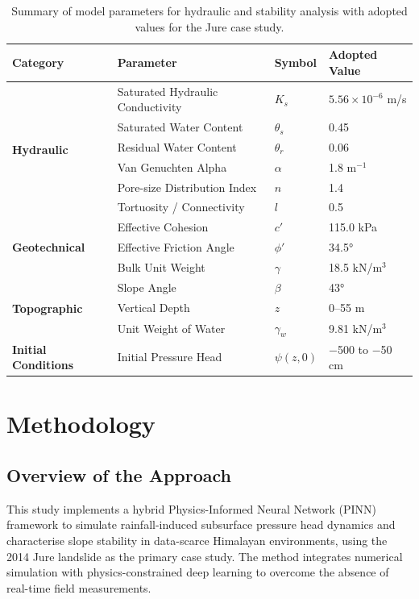 \documentclass[12pt]{report}
\begin{document}
\begin{table}[htbp]
\centering
\begin{tabular}{llll}
\hline
\textbf{Category} & \textbf{Parameter} & \textbf{Symbol} &
\textbf{Adopted Value} \\
\hline
\multirow{6}{*}{\textbf{Hydraulic}}
    & Saturated Hydraulic Conductivity & $K_s$       & $5.56\times10^{-6}$ m/s \\
    & Saturated Water Content          & $\theta_s$  & 0.45 \\
    & Residual Water Content           & $\theta_r$  & 0.06 \\
    & Van Genuchten Alpha              & $\alpha$    & 1.8 m$^{-1}$ \\
    & Pore-size Distribution Index     & $n$         & 1.4 \\
    & Tortuosity / Connectivity        & $l$         & 0.5 \\
\hline
\multirow{3}{*}{\textbf{Geotechnical}}
    & Effective Cohesion               & $c'$        & 115.0 kPa \\
    & Effective Friction Angle         & $\phi'$     & 34.5° \\
    & Bulk Unit Weight                 & $\gamma$    & 18.5 kN/m$^3$ \\
\hline
\multirow{3}{*}{\textbf{Topographic}}
    & Slope Angle                      & $\beta$     & 43° \\
    & Vertical Depth                   & $z$         & 0--55 m \\
    & Unit Weight of Water             & $\gamma_w$  & 9.81 kN/m$^3$ \\
\hline
\textbf{Initial Conditions}
    & Initial Pressure Head            & $\psi(z,0)$ & $-$500 to $-$50 cm \\
\hline
\end{tabular}
\caption{Summary of model parameters for hydraulic and stability
analysis with adopted values for the Jure case study.}
\label{tab:model_parameters}
\end{table}
\chapter{Methodology}

\section{Overview of the Approach}

This study implements a hybrid Physics-Informed Neural Network (PINN)
framework to simulate rainfall-induced subsurface pressure head dynamics
and characterise slope stability in data-scarce Himalayan environments,
using the 2014 Jure landslide as the primary case study. The method
integrates numerical simulation with physics-constrained deep learning
to overcome the absence of real-time field measurements.
\end{document}
